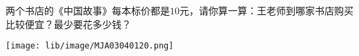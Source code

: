 两个书店的《中国故事》每本标价都是$10$元，请你算一算：王老师到哪家书店购买比较便宜？最少要花多少钱？
\begin{center}
    \texttt{[image: lib/image/MJA03040120.png]}
\end{center}